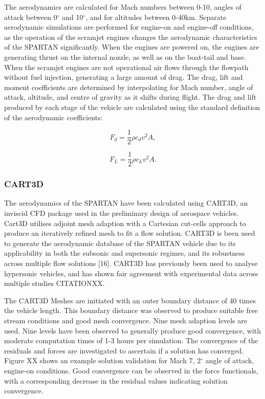 The aerodynamics are calculated for Mach numbers between 0-10, angles of attack between 0$^\circ$ and 10$^\circ$, and for altitudes between 0-40km. Separate aerodynamic simulations are performed for engine-on and engine-off conditions, as the operation of the scramjet engines changes the aerodynamic characteristics of the SPARTAN significantly. When the engines are powered on, the engines are generating thrust on the internal nozzle, as well as on the boat-tail and base.  When the scramjet engines are not operational air flows through the flowpath without fuel injection, generating a large amount of drag. 
The drag, lift and moment coefficients are determined by interpolating for Mach number, angle of attack, altitude, and centre of gravity as it shifts during flight.
		The drag and lift produced by each stage of the vehicle are calculated using the standard definition of the aerodynamic coefficients:
		
		\begin{equation}
		F_d = \frac{1}{2}\rho c_d v^2 A ,
		\end{equation}
		
		\begin{equation}
		F_L = \frac{1}{2}\rho c_L v^2 A .
		\end{equation}
		
		
		
		\subsubsection{CART3D}

				The aerodynamics of the SPARTAN have been calculated using CART3D, an inviscid CFD package used in the preliminary design of aerospace vehicles. Cart3D utilises adjoint mesh adaption with a Cartesian cut-cells approach to produce an iteratively refined mesh to fit a flow solution. CART3D is
				been used to generate the aerodynamic database of the SPARTAN vehicle due to its applicability in both the subsonic
				and supersonic regimes, and its robustness across multiple flow solutions [16]. CART3D has previously been used to
				analyse hypersonic vehicles, and has shown fair agreement with experimental data across multiple studies CITATIONXX.
				
						The CART3D Meshes are initiated with an outer boundary distance of 40 times the vehicle length. This boundary distance was observed to produce suitable free stream conditions and good mesh convergence. Nine mesh adaption levels are used. Nine levels have been observed to generally produce good convergence, with moderate computation times of 1-3 hours per simulation. The convergence of the residuals and forces are investigated to ascertain if a solution has converged. Figure XX shows an example solution validation for Mach 7, 2$^\circ$ angle of attack, engine-on conditions. Good convergence can be observed in the force functionals, with a corresponding decrease in the residual values indicating solution convergence.  
						
